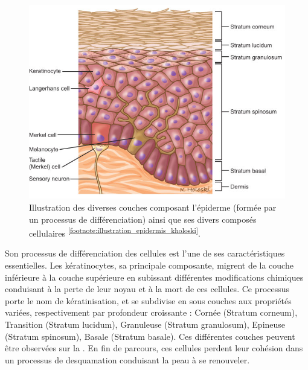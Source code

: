  \begin{figure}[H]
    \centering
    \includegraphics[width=0.7\linewidth]{contents/chapter_1/resources/illustration_epidermis_kholoski.png}
    \caption{Illustration des diverses couches composant l'épiderme (formée par un processus de différenciation) ainsi que ses divers composés cellulaires \textsuperscript{\ref{footnote:illustration_epidermis_kholoski}}.}
    \label{fig:illustration_epidermis_kholoski}
\end{figure}\par

\addtocounter{footnote}{1}

Son processus de différenciation des cellules est l’une de ses caractéristiques essentielles. Les kératinocytes, sa principale composante, migrent de la couche inférieure à la couche supérieure en subissant différentes modifications chimiques conduisant à la perte de leur noyau et à la mort de ces cellules. Ce processus porte le nom de kératinisation, et se subdivise en sous couches aux propriétés variées, respectivement par profondeur croissante : Cornée (Stratum corneum), Transition (Stratum lucidum), Granuleuse (Stratum granulosum), Epineuse (Stratum spinosum), Basale (Stratum basale). Ces différentes couches peuvent être observées sur la . En fin de parcours, ces cellules perdent leur cohésion dans un processus de desquamation conduisant la peau à se renouveler.\par\clearpage

